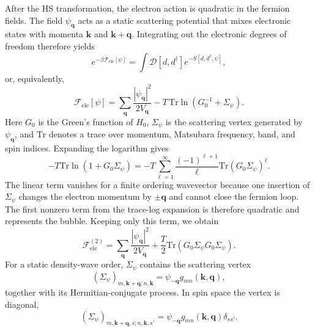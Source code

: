 \documentclass[aps,prx,article,twocolumn,amsmath,amssymb,superscriptaddress,longbibliography]{revtex4-2}
\begin{document}
After the HS transformation, the electron action is quadratic in the
fermion fields.  The field $\psi_{\mathbf q}$ acts as a static scattering
potential that mixes electronic states with momenta $\mathbf k$ and
$\mathbf k+\mathbf q$.  Integrating out the electronic degrees of freedom
therefore yields
\begin{equation}
e^{-\beta \mathcal{F}_{\mathrm{ele}}[\psi]}
=
\int
\mathcal D[d,d^\dagger]
e^{-S[d,d^\dagger,\psi]} ,
\end{equation}
or, equivalently,
\begin{equation}
\mathcal F_{\mathrm{ele}}[\psi]
=
\sum_{\mathbf q}
\frac{|\psi_{\mathbf q}|^2}{2V_{\mathbf q}}
-
T\,\mathrm{Tr}
\ln
\left(
G_0^{-1}
+
\Sigma_\psi
\right).
\end{equation}
Here $G_0$ is the Green's function of $H_0$, $\Sigma_\psi$ is the
scattering vertex generated by $\psi_{\mathbf q}$, and $\mathrm{Tr}$
denotes a trace over momentum, Matsubara frequency, band, and spin indices.
Expanding the logarithm gives
\begin{equation}\label{siLogExpansion}
-
T\mathrm{Tr}
\ln
\left(
1
+
G_0\Sigma_\psi
\right)
=
-
T
\sum_{\ell=1}^{\infty}
\frac{(-1)^{\ell+1}}{\ell}
\mathrm{Tr}
\left(
G_0\Sigma_\psi
\right)^\ell .
\end{equation}
The linear term vanishes for a finite ordering wavevector because one
insertion of $\Sigma_\psi$ changes the electron momentum by
$\pm\mathbf q$ and cannot close the fermion loop.  The first nonzero term
from the trace-log expansion is therefore quadratic and represents the
bubble.  Keeping only this term, we obtain
\begin{equation}
\label{eq:siQuadraticTrace}
\mathcal F_{\mathrm{ele}}^{(2)}
=
\sum_{\mathbf q}
\frac{|\psi_{\mathbf q}|^2}{2V_{\mathbf q}}
+
\frac{T}{2}
\mathrm{Tr}
\left(
G_0\Sigma_\psi
G_0\Sigma_\psi
\right).
\end{equation}
For a static density-wave order, $\Sigma_\psi$ contains the scattering
vertex
\begin{equation}
\left(\Sigma_\psi\right)_{m,\mathbf k+\mathbf q;n,\mathbf k}
=
\psi_{-\mathbf q}
g_{mn}(\mathbf k,\mathbf q),
\end{equation}
together with its Hermitian-conjugate process.  In spin space the vertex
is diagonal,
\begin{equation}
\left(\Sigma_\psi\right)_{m,\mathbf k+\mathbf q,s;n,\mathbf k,s'}
=
\psi_{-\mathbf q}
g_{mn}(\mathbf k,\mathbf q)
\delta_{ss'} .
\end{equation}
\end{document}
